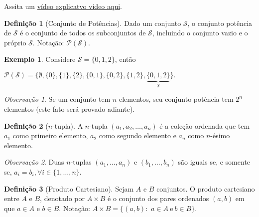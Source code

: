 \documentclass[]{book}
\theoremstyle{definition}
\newtheorem{definition}{Definição}[chapter]
\theoremstyle{definition}
\newtheorem{example}{Exemplo}[chapter]
\theoremstyle{definition}
\theoremstyle{remark}
\newtheorem*{remark}{Observação}
\begin{document}
Assita um \href{https://www.youtube.com/watch?v=WK47hxmVdv4}{vídeo explicatvo vídeo aqui}.

\begin{definition}[Conjunto de Potências]
\protect\hypertarget{def:defconjpot}{}{\label{def:defconjpot} \iffalse (Conjunto de Potências) \fi{} }Dado um conjunto \(\mathcal{S}\), o conjunto potência de \(\mathcal{S}\) é o conjunto de todos os subconjuntos de \(\mathcal{S}\), incluindo o conjunto vazio e o próprio \(\mathcal{S}\).
Notação: \(\mathcal{P}(\mathcal{S})\).
\end{definition}

\begin{example}
\protect\hypertarget{exm:unnamed-chunk-9}{}{\label{exm:unnamed-chunk-9} }
Considere \(\mathcal{S} = \{0,1,2\}\), então

\(\mathcal{P}(\mathcal{S}) = \{\emptyset, \{0\}, \{1\}, \{2\}, \{0,1\}, \{0,2\}, \{1,2\}, \underbrace{\{0,1,2\}}_{\mathcal{S}} \}.\)
\end{example}

\begin{remark}
\iffalse{} {Observação. } \fi{}Se um conjunto tem \(n\) elementos, seu conjunto potência tem \(2^n\) elementos (este fato será provado adiante).
\end{remark}

\begin{definition}[$n$-tupla]
\protect\hypertarget{def:defprodcart}{}{\label{def:defprodcart} \iffalse (\(n\)-tupla) \fi{} }A \(n\)-tupla \((a_1, a_2, \ldots, a_n)\) é a coleção ordenada que tem \(a_1\) como primeiro elemento, \(a_2\) como segundo elemento e \(a_n\) como \(n\)-ésimo elemento.
\end{definition}

\begin{remark}
\iffalse{} {Observação. } \fi{}Duas \(n\)-tuplas \((a_1, \ldots, a_n)\) e \((b_1, \ldots, b_n)\) são iguais se, e somente se, \(a_i = b_i, \forall i \in \{1, \ldots, n\}\).
\end{remark}

\begin{definition}[Produto Cartesiano]
\protect\hypertarget{def:defprodcart2}{}{\label{def:defprodcart2} \iffalse (Produto Cartesiano) \fi{} }Sejam \(A\) e \(B\) conjuntos.
O produto cartesiano entre \(A\) e \(B\), denotado por \(A \times B\) é o conjunto dos pares ordenados \((a,b)\) em que \(a \in A\) e \(b \in B\).
Notação: \(A \times B = \{(a,b):\) \(a \in A \ \text{e} \ b \in B\}.\)
\end{definition}
\end{document}
